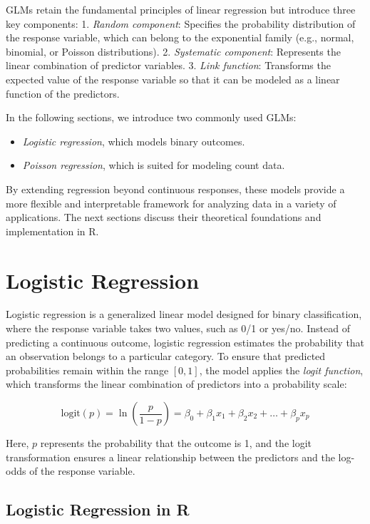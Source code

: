 \documentclass[
  11pt,
]{book}
\providecommand{\tightlist}{%
  \setlength{\itemsep}{0pt}\setlength{\parskip}{0pt}}
\theoremstyle{definition}
\theoremstyle{definition}
\theoremstyle{definition}
\theoremstyle{definition}
\theoremstyle{remark}
\begin{document}
GLMs retain the fundamental principles of linear regression but introduce three key components:
1. \emph{Random component}: Specifies the probability distribution of the response variable, which can belong to the exponential family (e.g., normal, binomial, or Poisson distributions).
2. \emph{Systematic component}: Represents the linear combination of predictor variables.
3. \emph{Link function}: Transforms the expected value of the response variable so that it can be modeled as a linear function of the predictors.

In the following sections, we introduce two commonly used GLMs:

\begin{itemize}
\tightlist
\item
  \emph{Logistic regression}, which models binary outcomes.
\item
  \emph{Poisson regression}, which is suited for modeling count data.
\end{itemize}

By extending regression beyond continuous responses, these models provide a more flexible and interpretable framework for analyzing data in a variety of applications. The next sections discuss their theoretical foundations and implementation in R.

\section{Logistic Regression}\label{logistic-regression}

Logistic regression is a generalized linear model designed for binary classification, where the response variable takes two values, such as 0/1 or yes/no. Instead of predicting a continuous outcome, logistic regression estimates the probability that an observation belongs to a particular category. To ensure that predicted probabilities remain within the range \([0,1]\), the model applies the \emph{logit function}, which transforms the linear combination of predictors into a probability scale:

\[
\text{logit}(p) = \ln\left(\frac{p}{1-p}\right) = \beta_0 + \beta_1 x_1 + \beta_2 x_2 + \dots + \beta_p x_p
\]

Here, \(p\) represents the probability that the outcome is 1, and the logit transformation ensures a linear relationship between the predictors and the log-odds of the response variable.

\subsection*{Logistic Regression in R}\label{logistic-regression-in-r}
\end{document}
